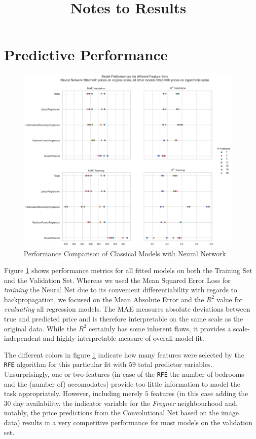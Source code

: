 \documentclass[12pt, letterpaper]{article}
\title{Notes to Results}
\author{}
\date{}
\begin{document}
\maketitle

\section{Predictive Performance}

\begin{figure}[t]
    \centering
    \includegraphics[width=\textwidth]{model_comparison.png}
    \caption{Performance Comparison of Classical Models with Neural Network}
    \label{fig:model-comparison}
\end{figure}

Figure \ref{fig:model-comparison} shows performance metrics for all fitted models on both the Training Set and the Validation Set.
Whereas we used the Mean Squared Error Loss for \emph{training} the Neural Net due to its convenient differentiability with regards to backpropagation, we focused on the Mean Absolute Error and the $R^2$ value for \emph{evaluating} all regression models.
The MAE measures absolute deviations between true and predicted price and is therefore interpretable on the same scale as the original data.
While the $R^2$ certainly has some inherent flaws, it provides a scale-independent and highly interpretable measure of overall model fit.

The different colors in figure \ref{fig:model-comparison} indicate how many features were selected by the \texttt{RFE} algorithm for this particular fit with $59$ total predictor variables.
Unsurprisingly, one or two features (in case of the \texttt{RFE} the number of bedrooms and the (number of) accomodates) provide too little information to model the task appropriately.
However, including merely $5$ features (in this case adding the $30$ day availability, the indicator variable for the \emph{Frogner} neighbourhood and, notably, the price predictions from the Convolutional Net based on the image data) results in a very competitive performance for most models on the validation set.
\end{document}
